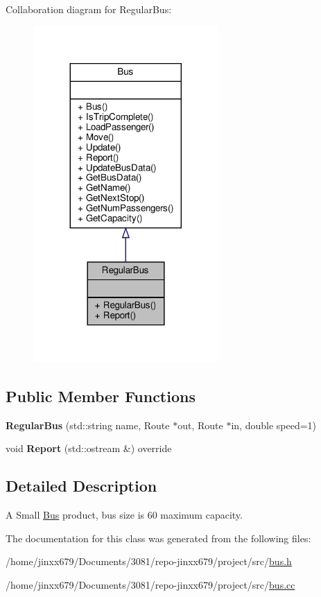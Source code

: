 Collaboration diagram for Regular\+Bus\+:\nopagebreak
\begin{figure}[H]
\begin{center}
\leavevmode
\includegraphics[width=200pt]{classRegularBus__coll__graph}
\end{center}
\end{figure}
\subsection*{Public Member Functions}
\begin{DoxyCompactItemize}
\item 
\mbox{\label{classRegularBus_aae4a0754bc23e8d3ac1f701172c4d8a0}} 
{\bfseries Regular\+Bus} (std\+::string name, Route $\ast$out, Route $\ast$in, double speed=1)
\item 
\mbox{\label{classRegularBus_a1c8e52afd8ba3cc1f6bf251e9cb10e5f}} 
void {\bfseries Report} (std\+::ostream \&) override
\end{DoxyCompactItemize}


\subsection{Detailed Description}
A Small \hyperlink{classBus}{Bus} product, bus size is 60 maximum capacity. 

The documentation for this class was generated from the following files\+:\begin{DoxyCompactItemize}
\item 
/home/jinxx679/\+Documents/3081/repo-\/jinxx679/project/src/\hyperlink{bus_8h}{bus.\+h}\item 
/home/jinxx679/\+Documents/3081/repo-\/jinxx679/project/src/\hyperlink{bus_8cc}{bus.\+cc}\end{DoxyCompactItemize}
